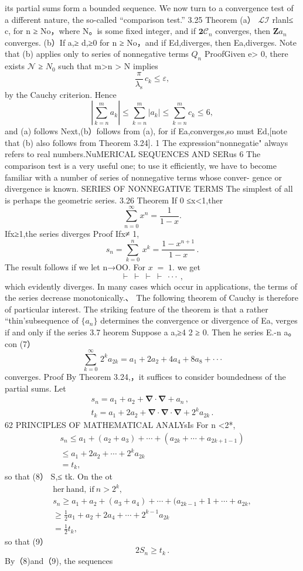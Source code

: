 its partial sums form a bounded sequence. We now turn to a convergence test of a different nature, the so-called “comparison test.” 3.25 Theorem (a） ${\mathcal{L}}{\mathcal{I}}$ rlanl≤ c, for n ≥ No，where N。is some fixed integer, and if $\textstyle{\mathbf{2}}{\mathcal{C}}_{n}$ converges, then $\textstyle{\mathbf{Z}}a_{n}$ converges. (b）If a,≥ d,≥0 for n ≥ No，and if Ed,diverges, then Ea,diverges. Note that (b) applies only to series of nonnegative terms $Q_{n}$ ProofGiven e> 0, there exists $\mathcal{N}$ ≥ $N_{0}$ such that m>n > N implies $$ {\frac{\pi}{\lambda_{\mathrm{s}}}}\,c_{k}\leq\varepsilon, $$ by the Cauchy criterion. Hence $$ \left|\sum_{k=n}^{m}a_{k}\right|\leq\sum_{k=n}^{m}|a_{k}|\leq\sum_{k=n}^{m}c_{k}\leq6, $$ and (a) follows Next,(b）follows from (a), for if Ea,converges,so must Ed,[note that (b) also follows from Theorem 3.24]. 1 The expression“nonnegatie" always refers to real numbers.NuMERICAL SEQUENCES AND SERus 6 The comparison test is a very useful one; to use it efficiently, we have to become familiar with a number of series of nonnegative terms whose conver- gence or divergence is known. SERIES OF NONNEGATIVE TERMS The simplest of all is perhaps the geometric series. 3.26 Theorem If 0 ≤x<1,ther $$ \sum_{n=0}^{\infty}x^{n}={\frac{1}{1-x}}. $$ Ifx≥1,the series diverges Proof Ifx≠ 1, $$ s_{n}=\sum_{k=0}^{n}\,x^{k}=\frac{1-x^{n+1}}{1-x}\,. $$ The result follows if we let n→OO. For $\scriptstyle x\;=\;1.$ we get $$ \vdash\ \vdash\ \vdash\ \vdash\ \cdot\cdot\cdot\ , $$ which evidently diverges. In many cases which occur in applications, the terms of the series decrease monotonically.、 The following theorem of Cauchy is therefore of particular interest. The striking feature of the theorem is that a rather “thin’subsequence of $\{a_{n}\}$ determines the convergence or divergence of Ea, verges if and only if the series 3.7 heorem Suppose a a,≥4 2 ≥ 0. Then he series E.-n a。con (7） $$ \sum_{k=0}^{\infty}\,2^{k}a_{2k}=a_{1}+2a_{2}+4a_{4}+8a_{8}+\cdot\cdot\cdot $$ converges. Proof By Theorem 3.24,，it suffices to consider boundedness of the partial sums. Let $$ \begin{array}{l}{{s_{n}=a_{1}+a_{2}+\mathbf{\nabla}\cdot\mathbf{\nabla}+a_{n}\,,}}\\ {{t_{k}=a_{1}+2a_{2}+\mathbf{\nabla}\cdot\mathbf{\nabla}\cdot\mathbf{\nabla}+2^{k}a_{2k}\,.}}\end{array} $$62 PRINCIPLES OF MATHEMATICAL ANALYsIs For n <2*, $$ \begin{array}{c}{{s_{n}\leq a_{1}+(a_{2}+a_{3})+\cdots+(a_{2k}+\cdots+a_{2k+1-1})}}\\ {{\leq a_{1}+2a_{2}+\cdots+2^{k}a_{2k}}}\\ {{=t_{k},}}\end{array} $$ so that (8） S,≤ tk. On the ot $$ \begin{array}{l}{{\mathrm{her~hand,~if~}n>2^{k},}}\\ {{s_{n}\geq a_{1}+a_{2}+(a_{3}+a_{4})+\cdots+(a_{2k-1}+1+\cdots+a_{2k},}}\\ {{\geq\frac{1}{2}a_{1}+a_{2}+2a_{4}+\cdots+2^{k-1}a_{2k}}}\\ {{=\frac{1}{2}t_{k},}}\end{array} $$ so that (9） $$ 2S_{n}\geq t_{k}\,. $$ By（8)and（9), the sequences 